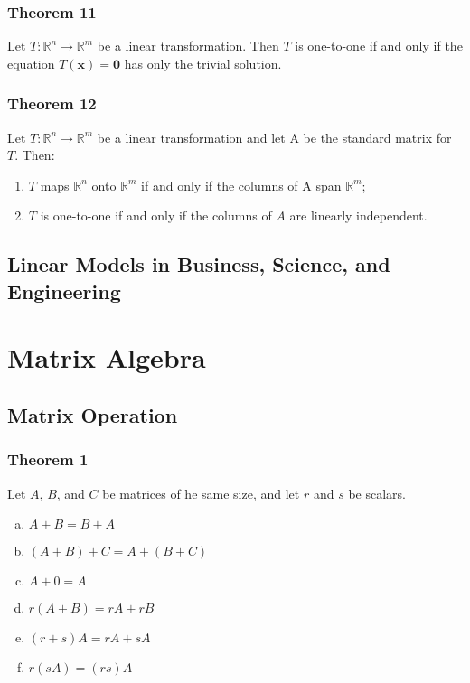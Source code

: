 \documentclass[letterpaper,11pt]{article}
\begin{document}
			\subsubsection{Theorem 11}
				Let $T:\mathbb{R}^n\rightarrow\mathbb{R}^m$ be a linear transformation. Then $T$ is one-to-one if and only if the equation $T(\mathbf{x})=\mathbf{0}$ has only the trivial solution.
			\subsubsection{Theorem 12}
				Let $T:\mathbb{R}^n\rightarrow\mathbb{R}^m$ be a linear transformation and let A be the standard matrix for $T$. Then:
				\begin{enumerate}[i]
					\item $T$ maps $\mathbb{R}^n$ onto $\mathbb{R}^m$ if and only if the columns of A span $\mathbb{R}^m$;
					\item $T$ is one-to-one if and only if the columns of $A$ are linearly independent.
				\end{enumerate}
		\subsection{Linear Models in Business, Science, and Engineering}
	\section{Matrix Algebra}
		\subsection{Matrix Operation}
			\subsubsection{Theorem 1}
				Let $A$, $B$, and $C$ be matrices of he same size, and let $r$ and $s$ be scalars.
				\begin{enumerate}[a.]
					\item $A+B=B+A$
					\item $(A+B)+C=A+(B+C)$
					\item $A+0=A$
					\item $r(A+B)=rA+rB$
					\item $(r+s)A=rA+sA$
					\item $r(sA)=(rs)A$
				\end{enumerate}
\end{document}
